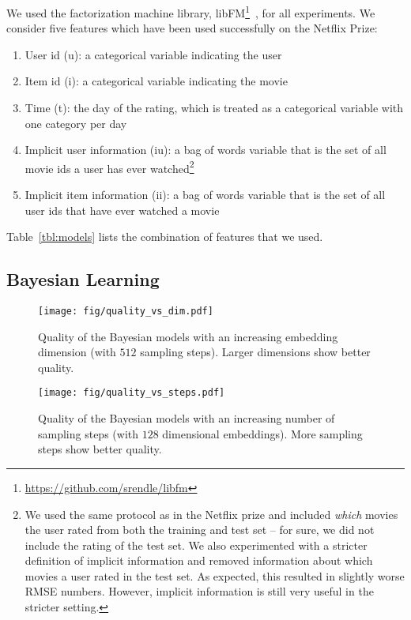 \documentclass{article}
\begin{document}
We used the factorization machine library, libFM\footnote{\url{https://github.com/srendle/libfm}}~\cite{rendle:tist12}, for all experiments.
We consider five features which have been used successfully on the Netflix Prize:
\begin{enumerate}
    \item User id (u): a categorical variable indicating the user
    \item Item id (i): a categorical variable indicating the movie
    \item Time (t): the day of the rating, which is treated as a categorical variable with one category per day
    \item Implicit user information (iu): a bag of words variable that is the set of all movie ids a user has ever watched\footnote{We used the same protocol as in the Netflix prize and included \emph{which} movies the user rated from both the training and test set -- for sure, we did not include the rating of the test set. We also experimented with a stricter definition of implicit information and removed information about which movies a user rated in the test set. As expected, this resulted in slightly worse RMSE numbers. However, implicit information is still very useful in the stricter setting.}
    \item Implicit item information (ii): a bag of words variable that is the set of all user ids that have ever watched a movie
\end{enumerate}
Table~\ref{tbl:models} lists the combination of features that we used.



\subsection{Bayesian Learning}



\begin{figure}[t]
    \centering
    \texttt{[image: fig/quality\_vs\_dim.pdf]}
    \caption{Quality of the Bayesian models with an increasing embedding dimension (with $512$ sampling steps). Larger dimensions show better quality.}
    \label{fig:ml10m_quality_vs_dim}
\end{figure}

\begin{figure}[t]
    \centering
    \texttt{[image: fig/quality\_vs\_steps.pdf]}
    \caption{Quality of the Bayesian models with an increasing number of sampling steps (with $128$ dimensional embeddings). More sampling steps show better quality.}
    \label{fig:ml10m_quality_vs_steps}
\end{figure}
\end{document}
